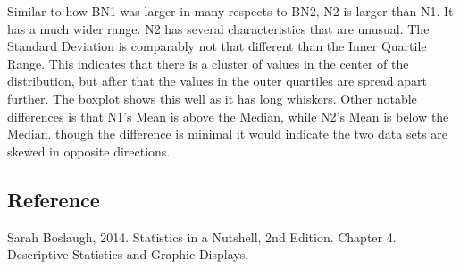 \documentclass[10pt]{article}
\begin{document}
\par
{}%
\hfill
{}%
\par
Similar to how BN1 was larger in many respects to BN2, N2 is larger than N1. It has a much wider range. N2 has several characteristics that are unusual. The Standard Deviation is comparably not that different than the Inner Quartile Range. This indicates that there is a cluster of values in the center of the distribution, but after that the values in the outer quartiles are spread apart further. The boxplot shows this well as it has long whiskers. Other notable differences is that N1's Mean is above the Median, while N2's Mean is below the Median. though the difference is minimal it would indicate the two data sets are skewed in opposite directions. 
\subsection*{Reference}
Sarah Boslaugh, 2014. Statistics in a Nutshell, 2nd Edition. Chapter 4. Descriptive Statistics and Graphic Displays.
\end{document}
